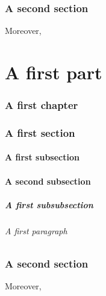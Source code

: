 \documentclass{article}
\newcounter{chapter}
\let\origsection\section
\newcommand{\chapter}[1]{\origsection{#1}}
\begin{document}
\section{A second section}
Moreover, \lipsum[1][1]



\part{A first part}
\chapter{A first chapter}
\section{A first section}
\lipsum[1][1]
\subsection{A first subsection}
\lipsum[2][1]
\subsection{A second subsection}
\lipsum[3][1]
\subsubsection{A first subsubsection}
\lipsum[4][1]
\paragraph{A first paragraph}
\lipsum[5][1]
\section{A second section}
Moreover, \lipsum[1][1]
\end{document}
